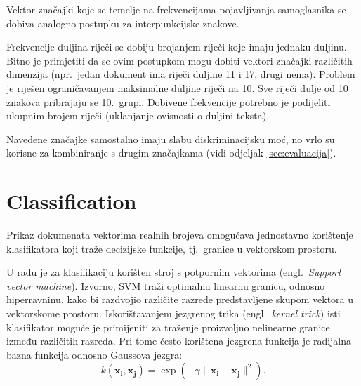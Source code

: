 \documentclass[11pt,english]{article}
\newcommand{\engl}[1]{(engl.~\emph{#1})}
\begin{document}
\begin{multicols}{2}
Vektor značajki koje se temelje na frekvencijama pojavljivanja samoglasnika se
dobiva analogno postupku za interpunkcijske znakove.

Frekvencije duljina riječi se dobiju brojanjem riječi koje imaju jednaku duljinu.
Bitno je primjetiti da se ovim postupkom mogu dobiti vektori značajki različitih
dimenzija (npr.~jedan dokument ima riječi duljine 11 i 17, drugi nema). Problem
je riješen ograničavanjem maksimalne duljine riječi na 10. Sve riječi dulje od 10
znakova pribrajaju se 10.~grupi. Dobivene frekvencije potrebno je podijeliti
ukupnim brojem riječi (uklanjanje ovisnosti o duljini teksta).

Navedene značajke samostalno imaju slabu diskriminacijsku moć, no vrlo su korisne
za kombiniranje s drugim značajkama (vidi odjeljak \ref{sec:evaluacija}).

\section{Classification}
Prikaz dokumenata vektorima realnih brojeva omogućava jednostavno korištenje
klasifikatora koji traže decizijske funkcije, tj.~granice u vektorskom
prostoru.


U radu je za klasifikaciju korišten stroj s potpornim vektorima \engl{Support
vector machine}. Izvorno, SVM traži optimalnu linearnu granicu, odnosno
hiperravninu, kako bi razdvojio različite razrede predstavljene skupom vektora u
vektorskome prostoru. Iskorištavanjem jezgrenog trika \engl{kernel trick} isti
klasifikator moguće je primijeniti za traženje proizvoljno nelinearne granice
između različitih razreda. Pri tome često korištena jezgrena funkcija je
radijalna bazna funkcija odnosno Gaussova jezgra:
\begin{equation}
k(\mathbf{x_i},\mathbf{x_j})=\exp(-\gamma \|\mathbf{x_i} - \mathbf{x_j}\|^2).
\end{equation}


\end{multicols}
\end{document}
